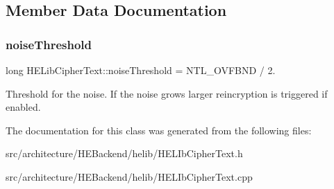 \subsection{Member Data Documentation}
\mbox{\label{classHELibCipherText_a50b612eb9ab3d247d608ee1334af0e27}} 
\subsubsection{\texorpdfstring{noise\+Threshold}{noiseThreshold}}
{\footnotesize\ttfamily long H\+E\+Lib\+Cipher\+Text\+::noise\+Threshold = N\+T\+L\+\_\+\+O\+V\+F\+B\+ND / 2.\hspace{0.3cm}{\ttfamily [static]}}

Threshold for the noise. If the noise grows larger reincryption is triggered if enabled. 

The documentation for this class was generated from the following files\+:\begin{DoxyCompactItemize}
\item 
src/architecture/\+H\+E\+Backend/helib/H\+E\+L\+Ib\+Cipher\+Text.\+h\item 
src/architecture/\+H\+E\+Backend/helib/H\+E\+L\+Ib\+Cipher\+Text.\+cpp\end{DoxyCompactItemize}
